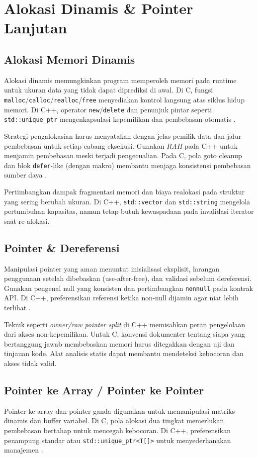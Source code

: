 \documentclass[../main.tex]{subfiles}
\begin{document}
\chapter{Alokasi Dinamis \& Pointer Lanjutan}
\section{Alokasi Memori Dinamis}
Alokasi dinamis memungkinkan program memperoleh memori pada runtime untuk ukuran data yang tidak dapat diprediksi di awal. Di C, fungsi \texttt{malloc}/\texttt{calloc}/\texttt{realloc}/\texttt{free} menyediakan kontrol langsung atas siklus hidup memori. Di C++, operator \texttt{new}/\texttt{delete} dan penunjuk pintar seperti \texttt{std::unique\_ptr} mengenkapsulasi kepemilikan dan pembebasan otomatis \parencite{iso-c-draft-n1570,cpp-reference}.

Strategi pengalokasian harus menyatakan dengan jelas pemilik data dan jalur pembebasan untuk setiap cabang eksekusi. Gunakan \emph{RAII} pada C++ untuk menjamin pembebasan meski terjadi pengecualian. Pada C, pola goto cleanup dan blok \texttt{defer}-like (dengan makro) membantu menjaga konsistensi pembebasan sumber daya \parencite{gnu-c-manual}.

Pertimbangkan dampak fragmentasi memori dan biaya realokasi pada struktur yang sering berubah ukuran. Di C++, \texttt{std::vector} dan \texttt{std::string} mengelola pertumbuhan kapasitas, namun tetap butuh kewaspadaan pada invalidasi iterator saat re-alokasi.

\section{Pointer \& Dereferensi}
Manipulasi pointer yang aman menuntut inisialisasi eksplisit, larangan penggunaan setelah dibebaskan (use-after-free), dan validasi sebelum dereferensi. Gunakan pengenal null yang konsisten dan pertimbangkan \texttt{nonnull} pada kontrak API. Di C++, preferensikan referensi ketika non-null dijamin agar niat lebih terlihat \parencite{gnu-c-manual,cpp-reference}.

Teknik seperti \emph{owner/raw pointer split} di C++ memisahkan peran pengelolaan dari akses non-kepemilikan. Untuk C, konvensi dokumenter tentang siapa yang bertanggung jawab membebaskan memori harus ditegakkan dengan uji dan tinjauan kode. Alat analisis statis dapat membantu mendeteksi kebocoran dan akses tidak valid.

\section{Pointer ke Array / Pointer ke Pointer}
Pointer ke array dan pointer ganda digunakan untuk memanipulasi matriks dinamis dan buffer variabel. Di C, pola alokasi dua tingkat memerlukan pembebasan bertahap untuk mencegah kebocoran. Di C++, preferensikan penampung standar atau \texttt{std::unique\_ptr<T[]>} untuk menyederhanakan manajemen \parencite{iso-c-draft-n1570,cpp-reference}.
\end{document}
